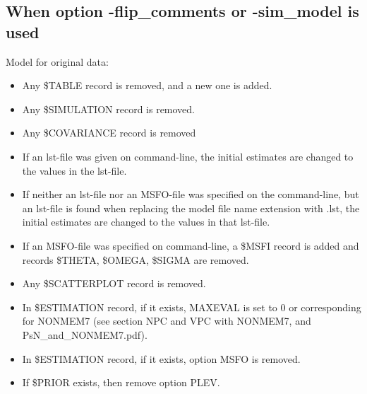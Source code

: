 \subsection{When option -flip\_comments or -sim\_model is used}
Model for original data:  
\begin{itemize}
	\item Any \$TABLE record is removed, and a new one is added.
	\item Any \$SIMULATION record is removed.
	\item Any \$COVARIANCE record is removed
	\item If an lst-file was given on command-line, the initial estimates are changed to the values in the lst-file. 
	\item If neither an lst-file nor an MSFO-file was specified on the command-line, but an lst-file is found when replacing the model file name extension with .lst, the initial estimates are changed to the values in that lst-file.
	\item If an MSFO-file was specified on command-line, a \$MSFI record is added and records \$THETA, \$OMEGA, \$SIGMA are removed.  
	\item Any \$SCATTERPLOT record is removed.
	\item In \$ESTIMATION record, if it exists, MAXEVAL is set to 0 or corresponding for  NONMEM7 (see section NPC and VPC with NONMEM7, and PsN\_and\_NONMEM7.pdf).
	\item In \$ESTIMATION record, if it exists, option MSFO is removed.
	\item If \$PRIOR exists, then remove option PLEV.
\end{itemize}

